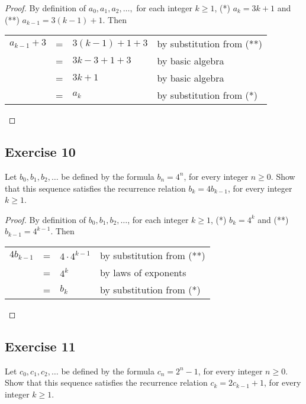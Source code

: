 \documentclass[14pt]{extarticle}
\newcommand{\cy}{\color{cyan}}
\begin{document}
\begin{proof}
    By definition of $a_0, a_1, a_2, \ldots,$ for each integer $k \geq 1$, (*) $a_k = 3k + 1$ and
    (**) $a_{k-1} = 3(k - 1) + 1$. Then

    \begin{tabular}{lcll}
        $a_{k-1} + 3$ & = & $3(k - 1) + 1 + 3$ & {\cy by substitution from (**)} \\
                      & = & $3k - 3 + 1 + 3$   & {\cy by basic algebra}          \\
                      & = & $3k+1$             & {\cy by basic algebra}          \\
                      & = & $a_k$              & {\cy by substitution from (*)}  \\
    \end{tabular}
\end{proof}

\subsection{Exercise 10}
Let $b_0, b_1, b_2, \ldots$ be defined by the formula $b_n = 4^n$, for every integer $n \geq 0$. Show that this
sequence satisfies the recurrence relation $b_k = 4b_{k - 1}$, for every integer $k \geq 1$.

\begin{proof}
    By definition of $b_0, b_1, b_2, \ldots$, for each integer $k \geq 1$, (*) $b_k = 4^k$ and
    (**) $b_{k-1} = 4^{k - 1}$. Then

    \begin{tabular}{lcll}
        $4b_{k-1}$ & = & $4 \cdot 4^{k - 1}$ & {\cy by substitution from (**)} \\
                   & = & $4^k$               & {\cy by laws of exponents}      \\
                   & = & $b_k$               & {\cy by substitution from (*)}  \\
    \end{tabular}
\end{proof}

\subsection{Exercise 11}
Let $c_0, c_1, c_2, \ldots$ be defined by the formula $c_n = 2^n - 1$, for every integer $n \geq 0$. Show that this
sequence satisfies the recurrence relation $c_k = 2c_{k - 1} + 1$, for every integer $k \geq 1$.
\end{document}
